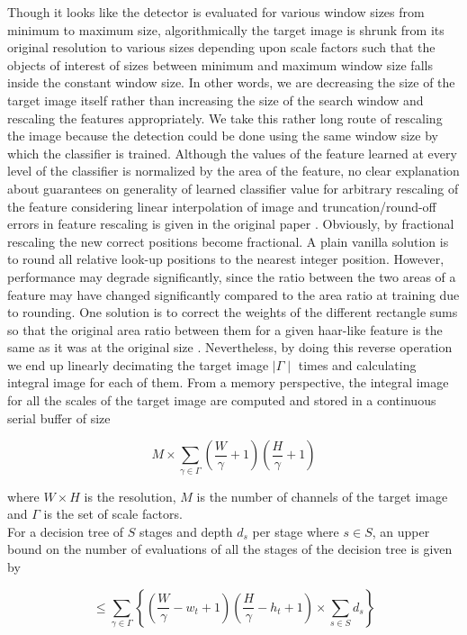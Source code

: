 Though it looks like the detector is evaluated for various window sizes from minimum to maximum size, algorithmically the target image is shrunk from its original resolution to various sizes depending upon scale factors such that the objects of interest of sizes between minimum and maximum window size falls inside the constant window size. In other words, we are decreasing the size of the target image itself rather than increasing the size of the search window and rescaling the features appropriately. We take this rather long route of rescaling the image because the detection could be done using the same window size by which the classifier is trained. Although the values of the feature learned at every level of the classifier is normalized by the area of the feature, no clear explanation about guarantees on generality of learned classifier value for arbitrary rescaling of the feature considering linear interpolation of image and truncation/round-off errors in feature rescaling is given in the original paper \cite{violajones}. Obviously, by fractional rescaling the new correct positions become fractional. A plain vanilla solution is to round all relative look-up positions to the nearest integer position. However, performance may degrade significantly, since the ratio between the two areas of a feature may have changed significantly compared to the area ratio at training due to rounding. One solution is to correct the weights of the different rectangle sums so that the original area ratio between them for a given haar-like feature is the same as it was at the original size \cite{classifier4}. Nevertheless, by doing this reverse operation we end up linearly decimating the target image $\mid \Gamma \mid$ times and calculating integral image for each of them. From a memory perspective, the integral image for all the scales of the target image are computed and stored in a continuous serial buffer of size

$$ M \times \sum_{\gamma \in \Gamma} \left ( \frac{W}{\gamma} + 1 \right ) \left ( \frac{H}{\gamma} + 1  \right ) $$

where $W \times H$ is the resolution, $M$ is the number of channels of the target image and $\Gamma$ is the set of scale factors.  \\ 

\noindent
For a decision tree of $S$ stages and depth $d_s$ per stage where $s \in S$, an upper bound on the number of evaluations of all the stages of the decision tree is given by 

\begin{equation}
\le \sum_{\gamma \in \Gamma} \left \{ \left ( \frac{W}{\gamma} - w_t + 1 \right ) \left ( \frac{H}{\gamma} - h_t + 1  \right ) \times \sum_{s \in S} d_s \right \}
\label{eq10}
\end{equation}

